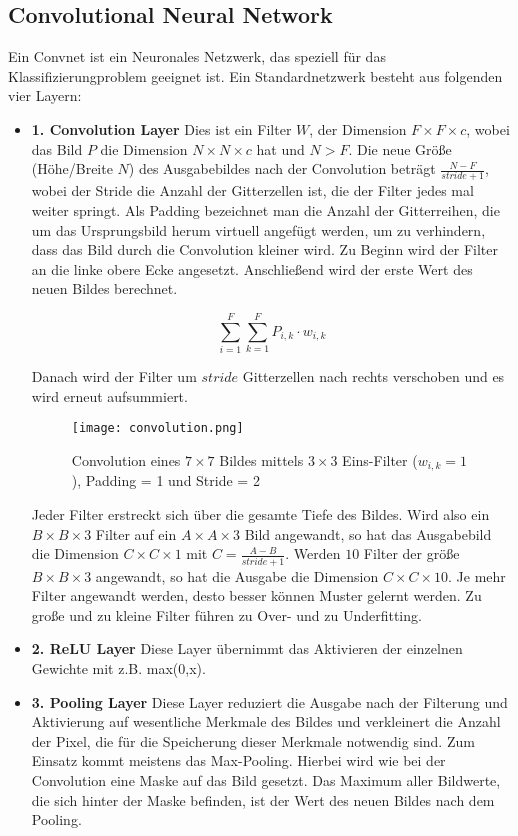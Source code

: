 \documentclass[11pt,fleqn]{book}
\begin{document}
\subsection{Convolutional Neural Network}
Ein Convnet ist ein Neuronales Netzwerk, das speziell für das Klassifizierungproblem geeignet ist. Ein Standardnetzwerk besteht aus folgenden vier Layern:

\begin{itemize}
\item \textbf{1. Convolution Layer} Dies ist ein Filter $W$, der Dimension $F \times F\times c$, wobei das Bild $P$ die Dimension $N\times N\times c$ hat und $N>F$. Die neue Größe (Höhe/Breite $N$) des Ausgabebildes nach der Convolution beträgt $\frac{N-F}{stride+1}$, wobei der Stride die Anzahl der Gitterzellen ist, die der Filter jedes mal weiter springt. Als Padding bezeichnet man die Anzahl der Gitterreihen, die um das Ursprungsbild herum virtuell angefügt werden, um zu verhindern, dass das Bild durch die Convolution kleiner wird. Zu Beginn wird der Filter an die linke obere Ecke angesetzt. Anschließend wird der erste Wert des neuen Bildes berechnet.

\[\sum_{i=1}^F \sum_{k=1}^F{P_{i,k} \cdot w_{i,k}}\]

Danach wird der Filter um $stride$ Gitterzellen nach rechts verschoben und es wird erneut aufsummiert.

\begin{figure}[h]
\centering
\texttt{[image: convolution.png]}
\caption{Convolution eines $7 \times 7$ Bildes mittels $3 \times 3$ Eins-Filter ($w_{i,k} = 1$), Padding = 1 und Stride = 2}
\end{figure}

Jeder Filter erstreckt sich über die gesamte Tiefe des Bildes. Wird also ein $B\times B\times 3$ Filter auf ein $A\times A\times 3$ Bild angewandt, so hat das Ausgabebild die Dimension $C\times C\times 1$ mit $C = \frac{A-B}{stride+1}$. Werden $10$ Filter der größe $B\times B\times 3$ angewandt, so hat die Ausgabe die Dimension $C\times C\times 10$. Je mehr Filter angewandt werden, desto besser können Muster gelernt werden. Zu große und zu kleine Filter führen zu Over- und zu Underfitting.

\item \textbf{2. ReLU Layer} Diese Layer übernimmt das Aktivieren der einzelnen Gewichte mit z.B. max(0,x).

\item \textbf{3. Pooling Layer} Diese Layer reduziert die Ausgabe nach der Filterung und Aktivierung auf wesentliche Merkmale des Bildes und verkleinert die Anzahl der Pixel, die für die Speicherung dieser Merkmale notwendig sind. Zum Einsatz kommt meistens das Max-Pooling. Hierbei wird wie bei der Convolution eine Maske auf das Bild gesetzt. Das Maximum aller Bildwerte, die sich hinter der Maske befinden, ist der Wert des neuen Bildes nach dem Pooling. 


\end{itemize}
\end{document}
